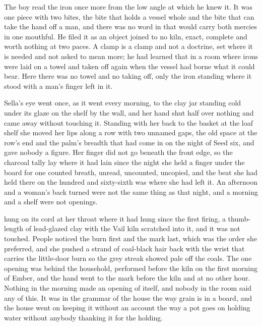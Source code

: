 The boy read the iron once more from the low angle at which he knew it. It was one piece with two bites, the bite that holds a vessel whole and the bite that can take the hand off a man, and there was no word in  that would carry both mercies in one mouthful. He filed it as an object joined to no kiln, exact, complete and worth nothing at two paces. A clamp is a clamp and not a doctrine, set where it is needed and not asked to mean more; he had learned that in a room where irons were laid on a towel and taken off again when the vessel had borne what it could bear. Here there was no towel and no taking off, only the iron standing where it stood with a man's finger left in it.

\scenebreak

Sella's eye went once, as it went every morning, to the clay jar standing cold under its glaze on the shelf by the wall, and her hand shut half over nothing and came away without touching it. Standing with her back to the basket at the loaf shelf she moved her lips along a row with two unnamed gaps, the old space at the row's end and the palm's breadth that had come in on the night of Seed six, and gave nobody a figure. Her finger did not go beneath the front edge, so the charcoal tally lay where it had lain since the night she held a finger under the board for one counted breath, unread, uncounted, uncopied, and the beat she had held there on the hundred and sixty-sixth was where she had left it. An afternoon and a woman's back turned were not the same thing as that night, and a morning and a shelf were not openings.

 hung on its cord at her throat where it had hung since the first firing, a thumb-length of lead-glazed clay with the Vail kiln scratched into it, and it was not touched. People noticed the burn first and the mark last, which was the order she preferred, and she pushed a strand of coal-black hair back with the wrist that carries the little-door burn so the grey streak showed pale off the coals. The one opening was behind the household, performed before the kiln on the first morning of Ember, and the hand went to the mark before the kiln and at no other hour. Nothing in the morning made an opening of itself, and nobody in the room said any of this. It was in the grammar of the house the way grain is in a board, and the house went on keeping it without an account the way a pot goes on holding water without anybody thanking it for the holding.

